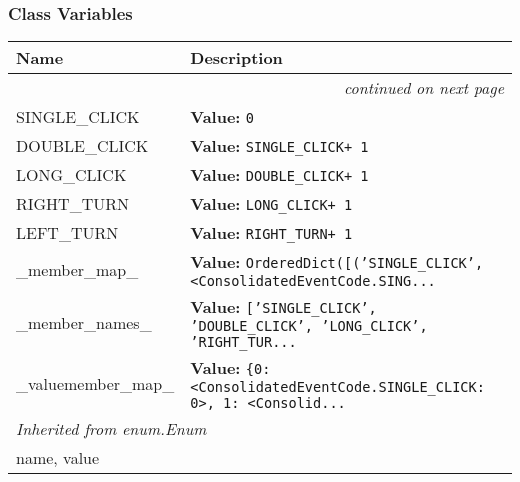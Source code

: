 
  \subsubsection{Class Variables}

    \vspace{-1cm}
\hspace{\varindent}\begin{longtable}{|p{\varnamewidth}|p{\vardescrwidth}|l}
\cline{1-2}
\cline{1-2} \centering \textbf{Name} & \centering \textbf{Description}& \\
\cline{1-2}
\endhead\cline{1-2}\multicolumn{3}{r}{\small\textit{continued on next page}}\\\endfoot\cline{1-2}
\endlastfoot\raggedright S\-I\-N\-G\-L\-E\-\_\-C\-L\-I\-C\-K\- & \raggedright \textbf{Value:} 
{\tt 0}&\\
\cline{1-2}
\raggedright D\-O\-U\-B\-L\-E\-\_\-C\-L\-I\-C\-K\- & \raggedright \textbf{Value:} 
{\tt SINGLE\_CLICK+ 1}&\\
\cline{1-2}
\raggedright L\-O\-N\-G\-\_\-C\-L\-I\-C\-K\- & \raggedright \textbf{Value:} 
{\tt DOUBLE\_CLICK+ 1}&\\
\cline{1-2}
\raggedright R\-I\-G\-H\-T\-\_\-T\-U\-R\-N\- & \raggedright \textbf{Value:} 
{\tt LONG\_CLICK+ 1}&\\
\cline{1-2}
\raggedright L\-E\-F\-T\-\_\-T\-U\-R\-N\- & \raggedright \textbf{Value:} 
{\tt RIGHT\_TURN+ 1}&\\
\cline{1-2}
\raggedright \_\-m\-e\-m\-b\-e\-r\-\_\-m\-a\-p\-\_\- & \raggedright \textbf{Value:} 
{\tt OrderedDict([('SINGLE\_CLICK', {\textless}ConsolidatedEventCode.SING\texttt{...}}&\\
\cline{1-2}
\raggedright \_\-m\-e\-m\-b\-e\-r\-\_\-n\-a\-m\-e\-s\-\_\- & \raggedright \textbf{Value:} 
{\tt \texttt{[}\texttt{'}\texttt{SINGLE\_CLICK}\texttt{'}\texttt{, }\texttt{'}\texttt{DOUBLE\_CLICK}\texttt{'}\texttt{, }\texttt{'}\texttt{LONG\_CLICK}\texttt{'}\texttt{, }\texttt{'}\texttt{RIGHT\_TUR}\texttt{...}}&\\
\cline{1-2}
\raggedright \_\-v\-a\-l\-u\-e\-2\-m\-e\-m\-b\-e\-r\-\_\-m\-a\-p\-\_\- & \raggedright \textbf{Value:} 
{\tt \texttt{\{}0\texttt{: }{\textless}ConsolidatedEventCode.SINGLE\_CLICK: 0{\textgreater}\texttt{, }1\texttt{: }{\textless}Consolid\texttt{...}}&\\
\cline{1-2}
\multicolumn{2}{|l|}{\textit{Inherited from enum.Enum}}\\
\multicolumn{2}{|p{\varwidth}|}{\raggedright name, value}\\
\cline{1-2}
\end{longtable}

